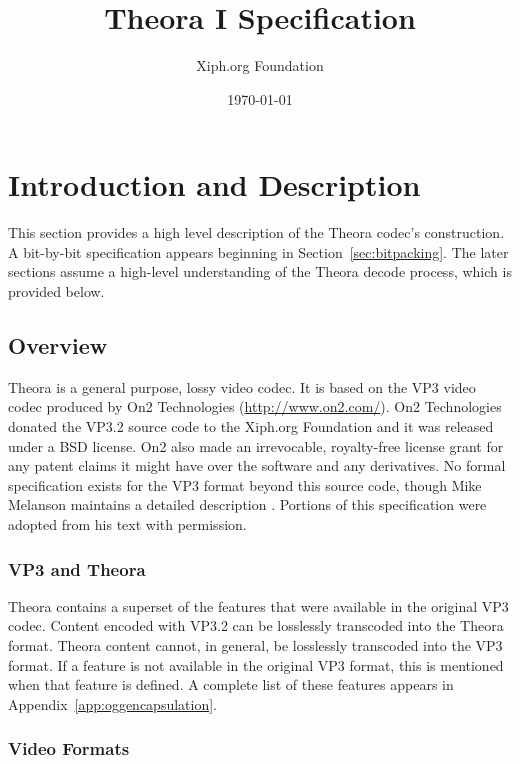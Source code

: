 \documentclass[11pt,letterpaper]{article}
\title{Theora I Specification}
\author{Xiph.org Foundation}
\date{\today}
\begin{document}
\maketitle
\tableofcontents
\newpage

\section{Introduction and Description}

This section provides a high level description of the Theora codec's
 construction.
A bit-by-bit specification appears beginning in Section~\ref{sec:bitpacking}.
The later sections assume a high-level understanding of the Theora decode
 process, which is provided below.

\subsection{Overview}

Theora is a general purpose, lossy video codec.
It is based on the VP3 video codec produced by On2 Technologies
 (\url{http://www.on2.com/}).
On2 Technologies donated the VP3.2 source code to the Xiph.org
 Foundation and it was released under a BSD license.
On2 also made an irrevocable, royalty-free license grant for any patent claims
 it might have over the software and any derivatives.
No formal specification exists for the VP3 format beyond this source code,
 though Mike Melanson maintains a detailed description \cite{Mel04}.
Portions of this specification were adopted from his text with permission.

\subsubsection{VP3 and Theora}

Theora contains a superset of the features that were available in the original
 VP3 codec.
Content encoded with VP3.2 can be losslessly transcoded into the Theora format.
Theora content cannot, in general, be losslessly transcoded into the VP3
 format.
If a feature is not available in the original VP3 format, this is mentioned
 when that feature is defined.
A complete list of these features appears in
 Appendix~\ref{app:oggencapsulation}.

\subsubsection{Video Formats}
\end{document}
